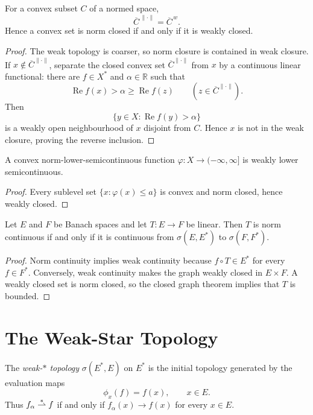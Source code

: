 \begin{notetheorem}
For a convex subset $C$ of a normed space,
\[
  \overline C^{\,\|\cdot\|}=\overline C^{\,w}.
\]
Hence a convex set is norm closed if and only if it is weakly closed.
\end{notetheorem}

\begin{proof}
The weak topology is coarser, so norm closure is contained in weak closure.  If
$x\notin\overline C^{\|\cdot\|}$, separate the closed convex set
$\overline C^{\|\cdot\|}$ from $x$ by a continuous linear functional: there
are $f\in X^*$ and $\alpha\in\mathbb R$ such that
\[
  \operatorname{Re}f(x)>\alpha
  \ge \operatorname{Re}f(z)
  \qquad(z\in\overline C^{\|\cdot\|}).
\]
Then
\[
  \{y\in X:\operatorname{Re}f(y)>\alpha\}
\]
is a weakly open neighbourhood of $x$ disjoint from $C$.  Hence $x$ is not in
the weak closure, proving the reverse inclusion.
\end{proof}

\begin{notecorollary}
A convex norm-lower-semicontinuous function
$\varphi\colon X\to(-\infty,\infty]$ is weakly lower semicontinuous.
\end{notecorollary}

\begin{proof}
Every sublevel set $\{x:\varphi(x)\le a\}$ is convex and norm closed, hence
weakly closed.
\end{proof}

\begin{notetheorem}
Let $E$ and $F$ be Banach spaces and let $T\colon E\to F$ be linear.  Then
$T$ is norm continuous if and only if it is continuous from
$\sigma(E,E^*)$ to $\sigma(F,F^*)$.
\end{notetheorem}

\begin{proof}
Norm continuity implies weak continuity because $f\circ T\in E^*$ for every
$f\in F^*$.  Conversely, weak continuity makes the graph weakly closed in
$E\times F$.  A weakly closed set is norm closed, so the closed graph theorem
implies that $T$ is bounded.
\end{proof}

\section{The Weak-Star Topology}

\begin{notedefinition}
The \emph{weak-$*$ topology} $\sigma(E^*,E)$ on $E^*$ is the initial topology
generated by the evaluation maps
\[
  \phi_x(f)=f(x),\qquad x\in E.
\]
Thus $f_\alpha\overset{*}{\rightharpoonup} f$ if and only if
$f_\alpha(x)\to f(x)$ for every $x\in E$.
\end{notedefinition}

